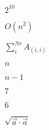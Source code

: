 \documentclass{article}
\begin{document}
$2^{10}$
\pagebreak

$O(n^2)$
\pagebreak

$\sum_{i}^{Nr} A_{(i,i)}$
\pagebreak

$n$
\pagebreak

$n-1$
\pagebreak

$7$
\pagebreak

$6$
\pagebreak

$\sqrt{\vec{a}\cdot\vec{a}}$
\pagebreak
\end{document}
